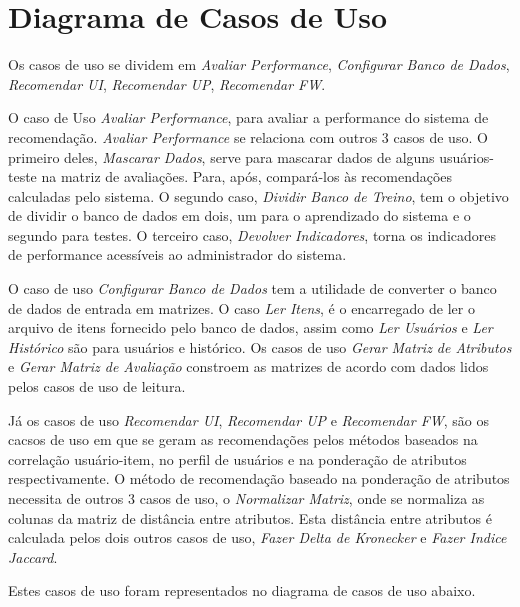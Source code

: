\section{Diagrama de Casos de Uso} %
\label{sec:Diagrama de Casos de Uso}

Os casos de uso se dividem em \textit{Avaliar Performance}, \textit{Configurar Banco de Dados}, \textit{Recomendar UI}, \textit{Recomendar UP}, \textit{Recomendar FW}.

O caso de Uso \textit{Avaliar Performance}, para avaliar a performance do sistema de recomendação. \textit{Avaliar Performance} se relaciona com outros 3 casos de uso. O primeiro deles, \textit{Mascarar Dados}, serve para mascarar dados de alguns usuários-teste na matriz de avaliações. Para, após, compará-los às recomendações calculadas pelo sistema. O segundo caso, \textit{Dividir Banco de Treino}, tem o objetivo de dividir o banco de dados em dois, um para o aprendizado do sistema e o segundo para testes. O terceiro caso, \textit{Devolver Indicadores}, torna os indicadores de performance acessíveis ao administrador do sistema.

O caso de uso \textit{Configurar Banco de Dados} tem a utilidade de converter o banco de dados de entrada em matrizes. O caso \textit{Ler Itens}, é o encarregado de ler o arquivo de itens fornecido pelo banco de dados, assim como \textit{Ler Usuários} e \textit{Ler Histórico} são para usuários e histórico. Os casos de uso \textit{Gerar Matriz de Atributos} e \textit{Gerar Matriz de Avaliação} constroem as matrizes de acordo com dados lidos pelos casos de uso de leitura.

Já os casos de uso \textit{Recomendar UI}, \textit{Recomendar UP} e \textit{Recomendar FW}, são os cacsos de uso em que se geram as recomendações pelos métodos baseados na correlação usuário-item, no perfil de usuários e na ponderação de atributos respectivamente. O método de recomendação baseado na ponderação de atributos necessita de outros 3 casos de uso, o \textit{Normalizar Matriz}, onde se normaliza as colunas da matriz de distância entre atributos. Esta distância entre atributos é calculada pelos dois outros casos de uso, \textit{Fazer Delta de Kronecker} e \textit{Fazer Indice Jaccard}.

 Estes casos de uso foram representados no diagrama de casos de uso abaixo.

